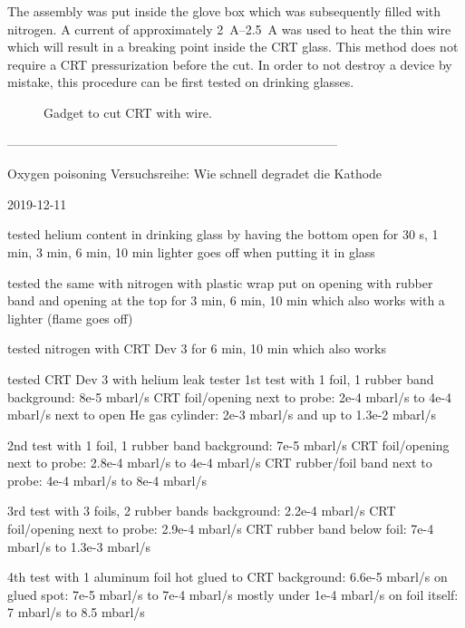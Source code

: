 The assembly was put inside the glove box which was subsequently filled with nitrogen. A current of approximately \SIrange{2}{2.5}{\ampere} was used to heat the thin wire which will result in a breaking point inside the CRT glass. This method does not require a CRT pressurization before the cut. In order to not destroy a device by mistake, this procedure can be first tested on drinking glasses.

\begin{figure}[h]
	
	\caption{Gadget to cut CRT with wire.}
	\label{fig:Gadget to cut CRT with wire}
\end{figure}

------------------------------------------------------------------------------

Oxygen poisoning 
Versuchsreihe: Wie schnell degradet die Kathode



2019-12-11

tested helium content in drinking glass by having the bottom open for 30 s, 1 min, 3 min, 6 min, 10 min
lighter goes off when putting it in glass

tested the same with nitrogen with plastic wrap put on opening with rubber band and opening at the top for 3 min, 6 min, 10 min which also works with a lighter (flame goes off)

tested nitrogen with CRT Dev 3 for 6 min, 10 min which also works

tested CRT Dev 3 with helium leak tester
1st test with 1 foil, 1 rubber band
background: 8e-5 mbarl/s
CRT foil/opening next to probe: 2e-4 mbarl/s  to 4e-4 mbarl/s
next to open He gas cylinder: 2e-3 mbarl/s and up to 1.3e-2 mbarl/s

2nd test with 1 foil, 1 rubber band
background: 7e-5 mbarl/s
CRT foil/opening next to probe: 2.8e-4 mbarl/s to 4e-4 mbarl/s
CRT rubber/foil band next to probe: 4e-4 mbarl/s to 8e-4 mbarl/s

3rd test with 3 foils, 2 rubber bands
background: 2.2e-4 mbarl/s
CRT foil/opening next to probe: 2.9e-4 mbarl/s
CRT rubber band below foil: 7e-4 mbarl/s to 1.3e-3 mbarl/s

4th test with 1 aluminum foil hot glued to CRT
background: 6.6e-5 mbarl/s
on glued spot: 7e-5 mbarl/s to 7e-4 mbarl/s mostly under 1e-4 mbarl/s 
on foil itself: 7 mbarl/s to 8.5 mbarl/s